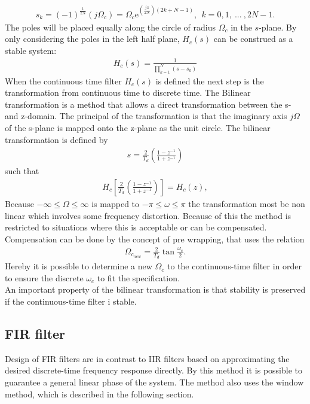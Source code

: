 \begin{align}
s_k = (-1)^{\frac{1}{2N}}\left(j\Omega_c\right)=\Omega_c\text{e}^{\left(\frac{j\pi}{2N}\right)\left(2k+N-1\right)}, \ \ k=0,1,\ ... \ , 2N-1.
\end{align}   
The poles will be placed equally along the circle of radius $\Omega_c$ in the $s$-plane. By only considering the poles in the left half plane, $H_c(s)$ can be construed as a stable system:
\begin{align}
H_c(s)=\frac{1}{\prod_{k=1}^{N}(s-s_k)}
\end{align}    
When the continuous time filter $H_c(s)$ is defined the next step is the transformation from continuous time to discrete time. The Bilinear transformation is a method that allows a direct transformation between the s- and z-domain. The principal of the transformation is that the imaginary axis $j\Omega$ of the s-plane is mapped onto the z-plane as the unit circle. The bilinear transformation is defined by 
\begin{align}
s=\frac{2}{T_d}\left(\frac{1-z^{-1}}{1+z^{-1}}\right) 
\end{align}
such that 
\begin{align}
H_c\left[\frac{2}{T_d}\left(\frac{1-z^{-1}}{1+z^{-1}}\right)\right]=H_c(z), 
\end{align}  
Because $-\infty \leq \Omega \leq \infty $ is mapped to $-\pi \leq \omega \leq \pi$ the transformation most be non linear which involves some frequency distortion. Because of this the method is restricted to situations where this is acceptable or can be compensated. Compensation can be done by the concept of pre wrapping, that uses the relation 
\begin{align}
\Omega_{c_{new}}=\frac{2}{T_d}\tan\frac{\omega_c}{2}.
\end{align}
Hereby it is possible to determine a new $\Omega_c$ to the continuous-time filter in order to ensure the discrete $\omega_c$ to fit the specification.\\
An important property of the bilinear transformation is that stability is preserved if the continuous-time filter i stable.
\subsection{FIR filter}\label{subsec:FIR}
Design of FIR filters are in contrast to IIR filters based on approximating the desired discrete-time frequency response directly. By this method it is possible to guarantee a general linear phase of the system. The method also uses the window method, which is described in the following section.
